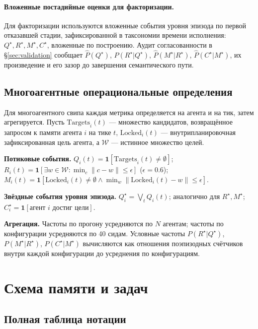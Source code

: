 \documentclass{article}
\begin{document}
\paragraph{Вложенные постадийные оценки для факторизации.}
Для факторизации используются вложенные события уровня эпизода по первой отказавшей стадии, зафиксированной в таксономии времени исполнения: $Q^\star, R^\star, M^\star, C^\star$, вложенные по построению. Аудит согласованности в \S\ref{sec:validation} сообщает $\hat P(Q^\star)$, $\hat P(R^\star|Q^\star)$, $\hat P(M^\star|R^\star)$, $\hat P(C^\star|M^\star)$, их произведение и его зазор до завершения семантического пути.

\subsection{Многоагентные операциональные определения}
\label{app:multi-agent-defs}

Для многоагентного свипа каждая метрика определяется на агента и на тик, затем агрегируется. Пусть $\mathrm{Targets}_i(t)$ --- множество кандидатов, возвращённое запросом к памяти агента $i$ на тике $t$, $\mathrm{Locked}_i(t)$ --- внутрипланировочная зафиксированная цель агента, а $\mathcal{W}$ --- истинное множество целей.

\textbf{Потиковые события.} $Q_i(t) = \mathbf{1}[\mathrm{Targets}_i(t) \ne \emptyset]$; $R_i(t) = \mathbf{1}[\exists w \in \mathcal{W}: \min_{c}\|c - w\| \le \epsilon]$ ($\epsilon = 0.6$); $M_i(t) = \mathbf{1}[\mathrm{Locked}_i(t) \ne \emptyset \land \min_w\|\mathrm{Locked}_i(t) - w\| \le \epsilon]$.

\textbf{Звёздные события уровня эпизода.} $Q^\star_i = \bigvee_t Q_i(t)$; аналогично для $R^\star, M^\star$; $C^\star_i = \mathbf{1}[\text{агент } i \text{ достиг цели}]$.

\textbf{Агрегация.} Частоты по прогону усредняются по $N$ агентам; частоты по конфигурации усредняются по 40 сидам. Условные частоты $P(R^\star|Q^\star)$, $P(M^\star|R^\star)$, $P(C^\star|M^\star)$ вычисляются как отношения поэпизодных счётчиков внутри каждой конфигурации до усреднения по конфигурациям.

\section{Схема памяти и задач}
\label{app:schemas}

\subsection{Полная таблица нотации}
\label{app:notation}
\end{document}
